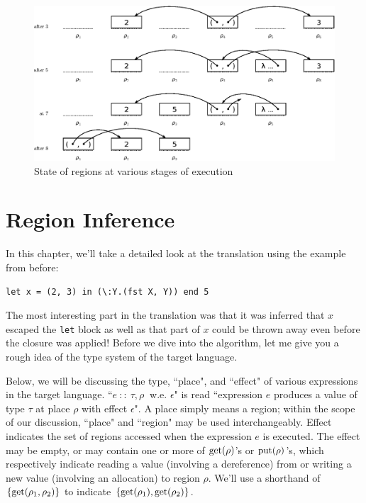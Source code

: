 \documentclass[11pt]{report}
\begin{document}
\begin{figure}[h]
\centering
\includegraphics[width=\textwidth]{regions-flow}
\caption{State of regions at various stages of execution}
\label{fig:regions}
\end{figure}

\chapter{Region Inference}

In this chapter, we'll take a detailed look at the translation using the example from before:

\begin{lstlisting}
let x = (2, 3) in (\:Y.(fst X, Y)) end 5
\end{lstlisting}

The most interesting part in the translation was that it was inferred that $x$ escaped the \texttt{let} block as well as that part of $x$ could be thrown away even before the closure was applied! Before we dive into the algorithm, let me give you a rough idea of the type system of the target language.

Below, we will be discussing the type, ``place", and ``effect" of various expressions in the target language. ``$e~::~\tau, \rho~$ w.e. $\epsilon$" is read ``expression $e$ produces a value of type $\tau$ at place $\rho$ with effect $\epsilon$". A place simply means a region; within the scope of our discussion, ``place" and ``region" may be used interchangeably. Effect indicates the set of regions accessed when the expression $e$ is executed. The effect may be empty, or may contain one or more of $\rm get(\rho)$'s or $\rm put(\rho)$'s, which respectively indicate reading a value (involving a dereference) from or writing a new value (involving an allocation) to region $\rho$. We'll use a shorthand of $\rm \{get(\rho_1, \rho_2)\}$ to indicate $\rm \{get(\rho_1), get(\rho_2)\}$.
\end{document}
